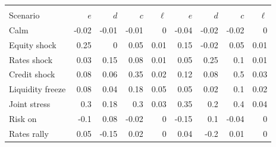 \begin{tabular}{@{}>{\scriptsize}l*{8}{>{\scriptsize}r}@{}}
\toprule
& \multicolumn{4}{c}{\scriptsize Near horizon} & \multicolumn{4}{c}{\scriptsize Far horizon} \\
\cmidrule(lr){2-5}\cmidrule(lr){6-9}
Scenario & $e$ & $d$ & $c$ & $\ell$ & $e$ & $d$ & $c$ & $\ell$ \\
\midrule
Calm & -0.02 & -0.01 & -0.01 & 0 & -0.04 & -0.02 & -0.02 & 0 \\
Equity shock & 0.25 & 0 & 0.05 & 0.01 & 0.15 & -0.02 & 0.05 & 0.01 \\
Rates shock & 0.03 & 0.15 & 0.08 & 0.01 & 0.05 & 0.25 & 0.1 & 0.01 \\
Credit shock & 0.08 & 0.06 & 0.35 & 0.02 & 0.12 & 0.08 & 0.5 & 0.03 \\
Liquidity freeze & 0.08 & 0.04 & 0.18 & 0.05 & 0.05 & 0.02 & 0.1 & 0.02 \\
Joint stress & 0.3 & 0.18 & 0.3 & 0.03 & 0.35 & 0.2 & 0.4 & 0.04 \\
Risk on & -0.1 & 0.08 & -0.02 & 0 & -0.15 & 0.1 & -0.04 & 0 \\
Rates rally & 0.05 & -0.15 & 0.02 & 0 & 0.04 & -0.2 & 0.01 & 0 \\
\bottomrule
\end{tabular}
